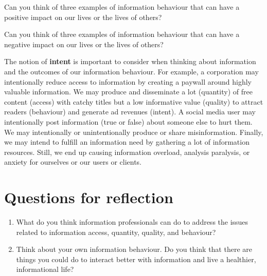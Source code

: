 \documentclass[
  letterpaper,
  DIV=11,
  numbers=noendperiod]{scrreprt}
\providecommand{\tightlist}{%
  \setlength{\itemsep}{0pt}\setlength{\parskip}{0pt}}
\begin{document}
\begin{tcolorbox}[enhanced jigsaw, arc=.35mm, bottomrule=.15mm, bottomtitle=1mm, breakable, colback=white, colbacktitle=quarto-callout-tip-color!10!white, colframe=quarto-callout-tip-color-frame, coltitle=black, left=2mm, leftrule=.75mm, opacityback=0, opacitybacktitle=0.6, rightrule=.15mm, title=\textcolor{quarto-callout-tip-color}{\faLightbulb}\hspace{0.5em}{Pause and reflect}, titlerule=0mm, toprule=.15mm, toptitle=1mm]

Can you think of three examples of information behaviour that can have a
positive impact on our lives or the lives of others?

Can you think of three examples of information behaviour that can have a
negative impact on our lives or the lives of others?

\end{tcolorbox}

The notion of \textbf{intent} is important to consider when thinking
about information and the outcomes of our information behaviour. For
example, a corporation may intentionally reduce access to information by
creating a paywall around highly valuable information. We may produce
and disseminate a lot (quantity) of free content (access) with catchy
titles but a low informative value (quality) to attract readers
(behaviour) and generate ad revenues (intent). A social media user may
intentionally post information (true or false) about someone else to
hurt them. We may intentionally or unintentionally produce or share
misinformation. Finally, we may intend to fulfill an information need by
gathering a lot of information resources. Still, we end up causing
information overload, analysis paralysis, or anxiety for ourselves or
our users or clients.

\section{Questions for reflection}\label{questions-for-reflection}

\begin{enumerate}
\def\labelenumi{\arabic{enumi}.}
\tightlist
\item
  What do you think information professionals can do to address the
  issues related to information access, quantity, quality, and
  behaviour?
\item
  Think about your own information behaviour. Do you think that there
  are things you could do to interact better with information and live a
  healthier, informational life?
\end{enumerate}
\end{document}
